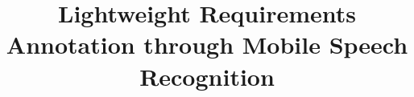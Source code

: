 \documentclass[conference]{IEEEtran}
\begin{document}
%
\title{Lightweight Requirements Annotation through Mobile Speech Recognition}


\end{document}

